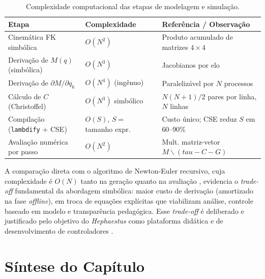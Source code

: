\begin{table}[h!]
\centering
\caption{Complexidade computacional das etapas de modelagem e simulação.}
\label{tab:complexidade}
\begin{tabular}{p{4.8cm} p{3.5cm} p{5.5cm}}
\hline
\textbf{Etapa} & \textbf{Complexidade} & \textbf{Referência / Observação} \\
\hline
Cinemática FK simbólica & $O(N^2)$ & Produto acumulado de matrizes $4\times4$ \cite{craig1989introduction} \\
Derivação de $M(q)$ (simbólica) & $O(N^3)$ & Jacobianos por elo \cite{siciliano2009robotics} \\
Derivação de $\partial M/\partial q_k$ & $O(N^4)$ (ingênuo) & Paralelizável por $N$ processos \cite{hollerbach1980recursive} \\
Cálculo de $C$ (Christoffel) & $O(N^3)$ simbólico & $N(N+1)/2$ pares por linha, $N$ linhas \cite{spong2020robot} \\
Compilação (\texttt{lambdify} + CSE) & $O(S)$, $S=$ tamanho expr. & Custo único; CSE reduz $S$ em 60--90\% \cite{alfred2007compilers, meurer2017sympy} \\
Avaliação numérica por passo & $O(N^2)$ & Mult. matriz-vetor $M\backslash(tau - C - G)$ \cite{golub2013matrix} \\
\hline
\end{tabular}
\end{table}

A comparação direta com o algoritmo de Newton-Euler recursivo, cuja complexidade é $O(N)$ tanto na geração quanto na avaliação \cite{luh1980online, hollerbach1980recursive}, evidencia o \textit{trade-off} fundamental da abordagem simbólica: maior custo de derivação (amortizado na fase \textit{offline}), em troca de equações explícitas que viabilizam análise, controle baseado em modelo e transparência pedagógica. Esse \textit{trade-off} é deliberado e justificado pelo objetivo do \textit{Hephaestus} como plataforma didática e de desenvolvimento de controladores \cite{corke2021toolbox}.

\section{Síntese do Capítulo}

